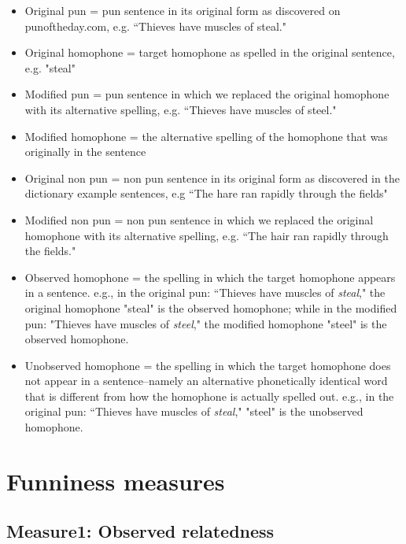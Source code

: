 \documentclass{article}
\begin{document}
\begin{itemize}
\item[] Original pun = pun sentence in its original form as discovered on punoftheday.com, e.g. ``Thieves have muscles of steal."

\item[] Original homophone = target homophone as spelled in the original sentence, e.g. "steal"

\item[] Modified pun = pun sentence in which we replaced the original homophone with its alternative spelling, e.g. ``Thieves have muscles of steel."

\item[] Modified homophone = the alternative spelling of the homophone that was originally in the sentence

\item[] Original non pun = non pun sentence in its original form as discovered in the dictionary example sentences, e.g ``The hare ran rapidly through the fields"

\item[] Modified non pun = non pun sentence in which we replaced the original homophone with its alternative spelling, e.g. ``The hair ran rapidly through the fields."

\item[] Observed homophone = the spelling in which the target homophone appears in a sentence. e.g., in the original pun: ``Thieves have muscles of \emph{steal}," the original homophone "steal" is the observed homophone; while in the modified pun: "Thieves have muscles of \emph{steel}," the modified homophone "steel" is the observed homophone.

\item[] Unobserved homophone = the spelling in which the target homophone does not appear in a sentence--namely an alternative phonetically identical word that is different from how the homophone is actually spelled out. e.g., in the original pun: ``Thieves have muscles of \emph{steal}," "steel" is the unobserved homophone.

\end{itemize}

\section{Funniness measures}

\subsection*{Measure1: Observed relatedness}
\end{document}
